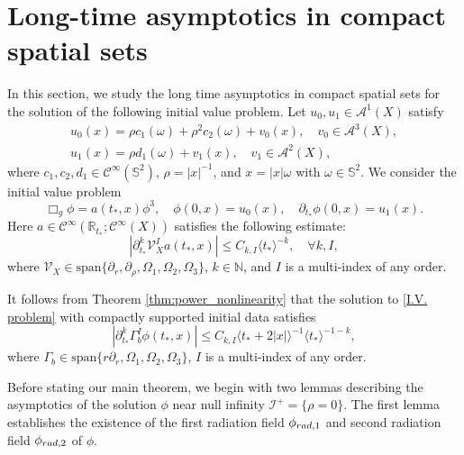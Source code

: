 \documentclass[10pt,a4paper,reqno]{amsart}
\newcommand{\CI}{\mathcal{C}^\infty}
\newcommand{\RR}{\mathbb{R}}
\newcommand{\NN}{\mathbb{N}}
\newcommand{\pa}{\partial}
\newcommand{\la}{\langle}
\newcommand{\ra}{\rangle}
\theoremstyle{definition}
\theoremstyle{remark}
\numberwithin{equation}{section}
\newcommand{\ts}{t_*}
\begin{document}
\section{Long-time asymptotics in compact spatial sets}

In this section, we study the long time asymptotics in compact spatial sets for the solution of the following initial value problem. Let $u_0, u_1 \in \mathcal{A}^1(X)$ satisfy
\begin{equation}
\label{initial data u0, u1}    \begin{gathered}
	u_0(x) = \rho c_1(\omega) + \rho^2 c_2(\omega) + v_0(x), \quad v_0 \in \mathcal{A}^3(X),\\
	u_1(x) = \rho d_1(\omega) + v_1(x), \quad v_1 \in \mathcal{A}^2(X),
\end{gathered}
\end{equation}
where $c_1, c_2, d_1 \in \CI(\mathbb{S}^2)$, $\rho = |x|^{-1}$, and $x = |x|\omega$ with $\omega \in \mathbb{S}^2$. We consider the initial value problem
\begin{equation}
\label{I.V. problem}
	\Box_g \phi = a(\ts,x)\phi^3,\quad \phi(0,x) = u_0(x),\quad \partial_{t_*}\phi(0,x) = u_1(x). 
\end{equation}
Here $a\in\CI(\RR_{\ts};\CI(X))$ satisfies the following estimate:
\begin{equation}
\label{a(t*,x) estimate}
    |\pa_{\ts}^k \mathcal{V}_X^I a(\ts,x)|\leq C_{k, I} \la \ts \ra^{-k},\quad\forall k,I,
\end{equation}
where $\mathcal{V}_X\in \mathrm{span}\{\pa_{r}, \pa_\rho, \Omega_1,\Omega_2,\Omega_3\}$, $k\in\NN$, and $I$ is a multi-index of any order.

\medskip
\noindent
It follows from Theorem \ref{thm:power_nonlinearity} that the solution to \eqref{I.V. problem} with compactly supported initial data satisfies 
\begin{equation}
\label{phi conormal est}
	|\pa_{\ts}^k \Gamma_b^I \phi(\ts,x)| \leq C_{k, I} \la\ts + 2|x|\ra^{-1} \la \ts \ra^{-1-k},
\end{equation}
where $\Gamma_b\in\mathrm{span}\{r\pa_{r},\Omega_1,\Omega_2,\Omega_3\}$, $I$ is a multi-index of any order.

Before stating our main theorem, we begin with two lemmas describing the asymptotics of the solution $\phi$ near null infinity $\mathscr I^{+} = \{\rho = 0\}$. The first lemma establishes the existence of the first radiation field $\phi_{\rm{rad},1}$ and second radiation field $\phi_{\rm{rad},2}$ of $\phi$.
\end{document}
